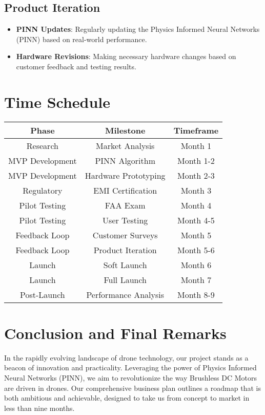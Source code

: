 \documentclass[12pt]{article}
\begin{document}
		\subsection{Product Iteration}
			\begin{itemize}
				\item \textbf{PINN Updates}: Regularly updating the Physics Informed Neural Networks (PINN) based on real-world performance.
				\item \textbf{Hardware Revisions}: Making necessary hardware changes based on customer feedback and testing results.
			\end{itemize}
	
	\section{Time Schedule}
	\begin{tabular}{|c|c|c|}
		\hline
		\textbf{Phase} & \textbf{Milestone} & \textbf{Timeframe} \\
		\hline
		Research & Market Analysis & Month 1 \\
		\hline
		MVP Development & PINN Algorithm & Month 1-2 \\
		\hline
		MVP Development & Hardware Prototyping & Month 2-3 \\
		\hline
		Regulatory & EMI Certification & Month 3 \\
		\hline
		Pilot Testing & FAA Exam & Month 4 \\
		\hline
		Pilot Testing & User Testing & Month 4-5 \\
		\hline
		Feedback Loop & Customer Surveys & Month 5 \\
		\hline
		Feedback Loop & Product Iteration & Month 5-6 \\
		\hline
		Launch & Soft Launch & Month 6 \\
		\hline
		Launch & Full Launch & Month 7 \\
		\hline
		Post-Launch & Performance Analysis & Month 8-9 \\
		\hline
	\end{tabular}
		
	\section{Conclusion and Final Remarks}
	In the rapidly evolving landscape of drone technology, our project stands as a beacon of innovation and practicality. Leveraging the power of Physics Informed Neural Networks (PINN), we aim to revolutionize the way Brushless DC Motors are driven in drones. Our comprehensive business plan outlines a roadmap that is both ambitious and achievable, designed to take us from concept to market in less than nine months.
	
\end{document}

